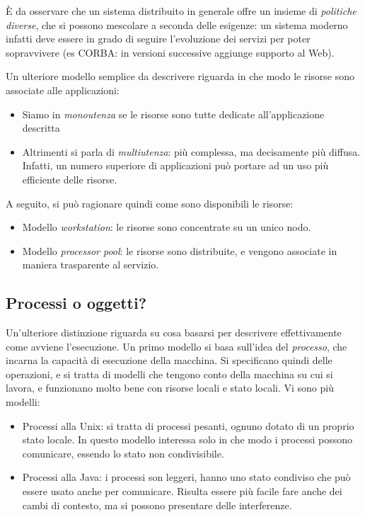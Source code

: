 È da osservare che un sistema distribuito in generale offre un insieme di \textit{politiche diverse}, che si possono
mescolare a seconda delle esigenze: un sistema moderno infatti deve essere in grado di seguire l'evoluzione dei servizi
per poter sopravvivere (es CORBA: in versioni successive aggiunge supporto al Web).

Un ulteriore modello semplice da descrivere riguarda in che modo le risorse
sono associate alle applicazioni:
\begin{itemize}
 \item Siamo in \textit{monoutenza} se le risorse sono tutte dedicate all'applicazione descritta
 \item Altrimenti si parla di \textit{multiutenza}: più complessa, ma decisamente più diffusa. Infatti, un numero
superiore di applicazioni può portare ad un uso più efficiente delle risorse.
\end{itemize}
A seguito, si può ragionare quindi come sono disponibili le risorse:
\begin{itemize}
 \item Modello \textit{workstation}: le risorse sono concentrate su un unico nodo.
 \item Modello \textit{processor pool}: le risorse sono distribuite, e vengono associate in maniera trasparente al
servizio.
\end{itemize}

\subsection{Processi o oggetti?}
Un'ulteriore distinzione riguarda su cosa basarsi per descrivere effettivamente come avviene l'esecuzione.
Un primo modello si basa sull'idea del \textit{processo}, che incarna la capacità di esecuzione della macchina. Si
specificano quindi delle operazioni, e si tratta di modelli che tengono conto della macchina su cui si lavora, e
funzionano molto
bene con risorse locali e stato locali. Vi sono più modelli:
\begin{itemize}
 \item Processi alla Unix: si tratta di processi pesanti, ognuno dotato di un proprio stato locale. In questo modello
interessa solo in che modo i processi possono comunicare, essendo lo stato non condivisibile.
 \item Processi alla Java: i processi son leggeri, hanno uno stato condiviso che può essere usato anche per comunicare.
Risulta essere più facile fare anche dei cambi di contesto, ma si possono presentare delle interferenze. 
\end{itemize}

